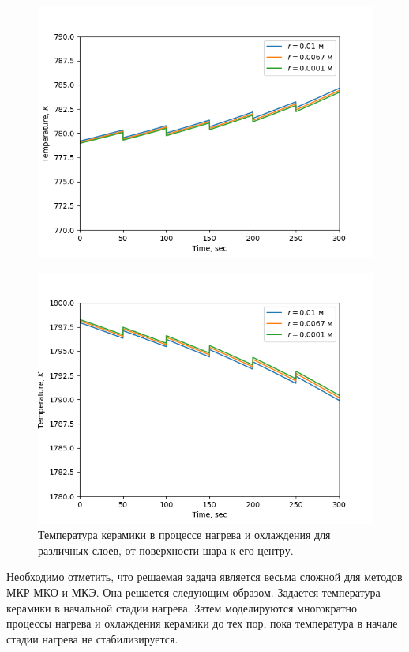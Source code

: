 \documentclass[a4paper,11pt,numreferences,mathsec,kaplist]{isuepsutf8}
\begin{document}
\begin{article}
\begin{figure}[ht]
    \begin{minipage}[t]{0.49\textwidth}
        \centering
        \includegraphics[width=\textwidth]{img3}
        \label{fig:img2}
    \end{minipage}
    \hfill
    \begin{minipage}[t]{0.49\textwidth}
        \centering
        \includegraphics[width=\textwidth]{img4}
    \end{minipage}
    \caption {Температура керамики в процессе нагрева и охлаждения для
    различных слоев, от поверхности шара к его центру.}
\end{figure}

Необходимо отметить, что решаемая задача является весьма сложной для
методов МКР МКО и МКЭ. Она решается следующим образом. Задается
температура керамики в начальной стадии нагрева. Затем моделируются
многократно процессы нагрева и охлаждения керамики до тех пор, пока
температура в начале стадии нагрева не стабилизируется. 


\end{article}
\end{document}
